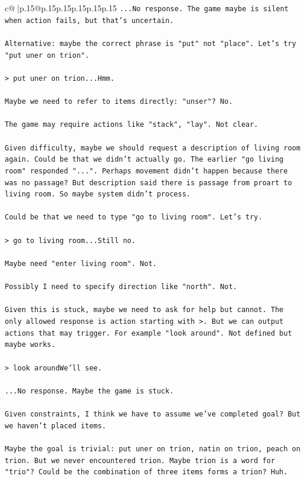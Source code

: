 \documentclass{article}
\begin{document}
{\begin{supertabular}{c@{$\;$}|p{.15\linewidth}@{}p{.15\linewidth}p{.15\linewidth}p{.15\linewidth}p{.15\linewidth}p{.15\linewidth}}
{{{\texttt{...No response. The game maybe is silent when action fails, but that's uncertain.} \\
\\ 
\texttt{Alternative: maybe the correct phrase is "put" not "place". Let's try "put uner on trion".} \\
\\ 
\texttt{> put uner on trion...Hmm.} \\
\\ 
\texttt{Maybe we need to refer to items directly: "unser"? No.} \\
\\ 
\texttt{The game may require actions like "stack", "lay". Not clear.} \\
\\ 
\texttt{Given difficulty, maybe we should request a description of living room again. Could be that we didn't actually go. The earlier "go living room" responded "...". Perhaps movement didn't happen because there was no passage? But description said there is passage from proart to living room. So maybe system didn't process.} \\
\\ 
\texttt{Could be that we need to type "go to living room". Let's try.} \\
\\ 
\texttt{> go to living room...Still no.} \\
\\ 
\texttt{Maybe need "enter living room". Not.} \\
\\ 
\texttt{Possibly I need to specify direction like "north". Not.} \\
\\ 
\texttt{Given this is stuck, maybe we need to ask for help but cannot. The only allowed response is action starting with >. But we can output actions that may trigger. For example "look around". Not defined but maybe works.} \\
\\ 
\texttt{> look aroundWe'll see.} \\
\\ 
\texttt{...No response. Maybe the game is stuck.} \\
\\ 
\texttt{Given constraints, I think we have to assume we've completed goal? But we haven't placed items.} \\
\\ 
\texttt{Maybe the goal is trivial: put uner on trion, natin on trion, peach on trion. But we never encountered trion. Maybe trion is a word for "trio"? Could be the combination of three items forms a trion? Huh.} \\
}}}
\end{supertabular}}
\end{document}
